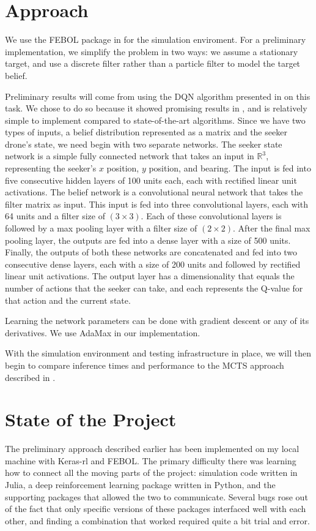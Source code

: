 \documentclass{article}
\begin{document}
\section{Approach}
We use the FEBOL package in \cite{febol} for the simulation enviroment. 
For a preliminary implementation, we simplify the problem in two ways: we assume a stationary target, and use a discrete filter rather than a particle filter to model the target belief.

Preliminary results will come from using the DQN algorithm presented in \cite{dqn} on this task. 
We chose to do so because it showed promising results in \cite{kyle}, and is relatively simple to implement compared to state-of-the-art algorithms.
Since we have two types of inputs, a belief distribution represented as a matrix and the seeker drone's state, we need begin with two separate networks. 
The seeker state network is a simple fully connected network that takes an input in $\mathbb{R}^{3}$, representing the seeker's $x$ position, $y$ position, and bearing.
The input is fed into five consecutive hidden layers of 100 units each, each with rectified linear unit activations.
The belief network is a convolutional neural network that takes the filter matrix as input.
This input is fed into three convolutional layers, each with 64 units and a filter size of $(3 \times 3)$.
Each of these convolutional layers is followed by a max pooling layer with a filter size of $(2 \times 2)$.
After the final max pooling layer, the outputs are fed into a dense layer with a size of 500 units.
Finally, the outputs of both these networks are concatenated and fed into two consecutive dense layers, each with a size of 200 units and followed by rectified linear unit activations.
The output layer has a dimensionality that equals the number of actions that the seeker can take, and each represents the Q-value for that action and the current state.

Learning the network parameters can be done with gradient descent or any of its derivatives.
We use AdaMax in our implementation.

With the simulation environment and testing infrastructure in place, we will then begin to compare inference times and performance to the MCTS approach described in \cite{dronehunter}.

\section{State of the Project}
The preliminary approach described earlier has been implemented on my local machine with Keras-rl and FEBOL.
The primary difficulty there was learning how to connect all the moving parts of the project: simulation code written in Julia, a deep reinforcement learning package written in Python, and the supporting packages that allowed the two to communicate.
Several bugs rose out of the fact that only specific versions of these packages interfaced well with each other, and finding a combination that worked required quite a bit trial and error.
\end{document}
